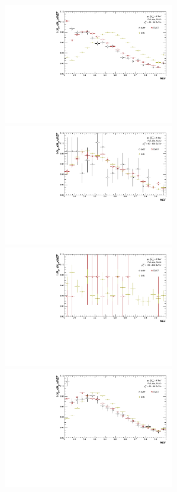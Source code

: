 \begin{figure}[h!]
    \centering
    \begin{multicols}{2}
            \includegraphics[width=7.5cm]{figures/NEF/All/hNEF_20-30GeV_R02.pdf}
            \includegraphics[width=7.5cm]{figures/NEF/All/hNEF_60-100GeV_R02.pdf}
            \includegraphics[width=7.5cm]{figures/NEF/All/hNEF_160-240GeV_R02.pdf}
        \vfill\null
        \columnbreak
            \includegraphics[width=7.5cm]{figures/NEF/All/hNEF_30-60GeV_R02.pdf}

\end{multicols}
\end{figure}
